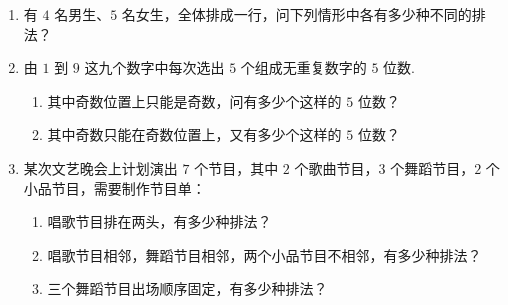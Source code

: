 \begin{enumerate}
\item 有 $4$ 名男生、$5$ 名女生，全体排成一行，问下列情形中各有多少种不同的排法？

\begin{jieda}
\end{jieda}

\item 由 $1$ 到 $9$ 这九个数字中每次选出 $5$ 个组成无重复数字的 $5$ 位数.
\begin{enumerate}
\item 其中奇数位置上只能是奇数，问有多少个这样的 $5$ 位数？
\item 其中奇数只能在奇数位置上，又有多少个这样的 $5$ 位数？
\end{enumerate}
\begin{jieda}
\end{jieda}

\item 某次文艺晚会上计划演出 $7$ 个节目，其中 $2$ 个歌曲节目，$3$ 个舞蹈节目，$2$ 个小品节目，需要制作节目单：
\begin{enumerate}
\item 唱歌节目排在两头，有多少种排法？
\item 唱歌节目相邻，舞蹈节目相邻，两个小品节目不相邻，有多少种排法？
\item 三个舞蹈节目出场顺序固定，有多少种排法？
\end{enumerate}


\end{enumerate}
